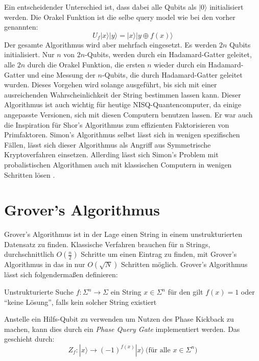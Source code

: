 Ein entscheidender Unterschied ist, dass dabei alle Qubits als $|0\rangle$ initialisiert werden.
Die Orakel Funktion ist die selbe query model wie bei den vorher genannten:
\begin{equation}
    U_f|x\rangle|y\rangle=|x\rangle|y\oplus f(x)\rangle
\end{equation}
Der gesamte Algorithmus wird aber mehrfach eingesetzt.
Es werden $2n$ Qubits initialisiert.
Nur $n$ von $2n$-Qubits, werden durch ein Hadamard-Gatter geleitet, alle $2n$ durch die Orakel Funktion, die ersten $n$ wieder durch ein Hadamard-Gatter und eine Messung der $n$-Qubits, die durch Hadamard-Gatter geleitet wurden.
Dieses Vorgehen wird solange ausgeführt, bis sich mit einer ausreichenden Wahrscheinlichkeit der String bestimmen lassen kann.
Dieser Algorithmus ist auch wichtig für heutige NISQ-Quantencomputer, da einige angepasste Versionen, sich mit diesen Computern benutzen lassen.
Er war auch die Inspiration für Shor's Algorithmus zum effizienten Faktorisieren von Primfaktoren.
Simon's Algorithmus selbst lässt sich in wenigen spezifischen Fällen, lässt sich dieser Algorithmus als Angriff aus Symmetrische Kryptoverfahren einsetzen.
Allerding lässt sich Simon's Problem mit probalistischen Algorithmen auch mit klassischen Computern in wenigen Schritten lösen \cite{SimonsAlgorithm,aumassonSeriousCryptographyPractical2018,chenComplexityNISQ2023}.

\section{Grover's Algorithmus}
Grover's Algorithmus ist in der Lage einen String in einem unstrukturierten Datensatz zu finden.
Klassische Verfahren brauchen für n Strings, durchschnittlich $O(\frac{n}{2})$ Schritte um einen Eintrag zu finden, mit Grover's Algorithmus in das in nur $O(\sqrt{N})$ Schritten möglich.
Grover's Algorithmus lässt sich folgendermaßen definieren:
\begin{problem}{Unstrukturierte Suche}
    \Input $f:\Sigma^n\to \Sigma$
    \Output ein String $x\in \Sigma^n$ für den gilt $f(x)=1$ oder \enquote{keine Lösung}, falls kein solcher String existiert
\end{problem}

Anstelle ein Hilfs-Qubit zu verwenden um Nutzen des Phase Kickback zu machen, kann dies durch ein \textit{Phase Query Gate} implementiert werden.
Das geschieht durch:
\begin{equation}
    Z_f:|x\rangle\to (-1)^{f(x)}|x\rangle\ \text{(für alle } x\in \Sigma^n)
\end{equation}

